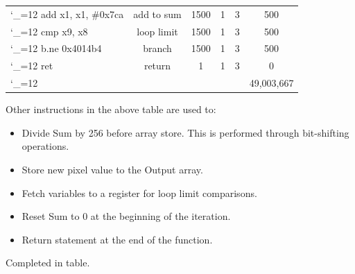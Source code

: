 \documentclass[
  course = {{ESE532 System-on-a-Chip}},
  quartile = {{}},
  assignment = 2,
  name = {{Sheil Sarda}},
  studentnumber = {{}},
  email = {{sheils@seas.upenn.edu}},
  firstexercise = 1
]{aga-homework}
\begin{document}
\begin{center}
\begin{tabular}{|| >{\ttfamily\catcode`_=12 }l | c | c | c | c | c ||}
    add     x1, x1, \#0x7ca     &  add to sum     & 1500     &1    &3    &  500 \\ 
    cmp     x9, x8     & loop limit      & 1500     &1  &3   &500   \\ 
    b.ne    0x4014b4      &   branch   &  1500   &1   &3   & 500  \\ 
   ret     &  return    & 1     &1   &3   &0   \\    
       \hline\hline       
    &     &     &   &   & 49,003,667   \\                       
    \hline
	\end{tabular}
\end{center}

\subexercise Other instructions in the above table are used to:
\begin{itemize}
	\item Divide Sum by 256 before array store. This is performed through bit-shifting operations.
	\item Store new pixel value to the Output array.
	\item Fetch variables to a register for loop limit comparisons.
	\item Reset Sum to 0 at the beginning of the iteration.
	\item Return statement at the end of the function.
\end{itemize} 
\subexercise Completed in table.
\end{document}
